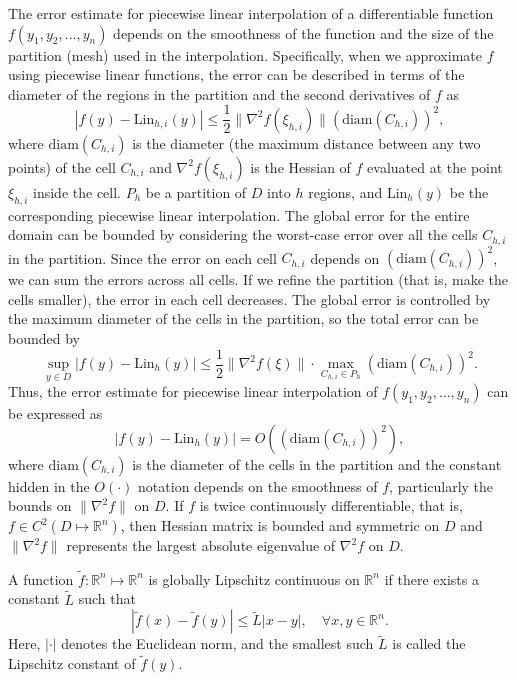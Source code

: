 \documentclass[preprint,12pt]{elsarticle}
\begin{document}
The error estimate for piecewise linear interpolation of a differentiable function \( f(y_1, y_2, \dots, y_n) \) depends on the smoothness of the function and the size of the partition (mesh) used in the interpolation. Specifically, when we approximate \( f \) using piecewise linear functions, the error can be described in terms of the diameter of the regions in the partition and the second derivatives of \( f \) \cite{burden2010numerical} as
\[
| f({y}) - \text{Lin}_{h,i}({y}) | \leq \frac{1}{2} \| \nabla^2 f(\xi_{h,i}) \| (\text{diam}(C_{h,i}))^2,
\]
where \( \text{diam}(C_{h,i}) \) is the diameter (the maximum distance between any two points) of the cell \( C_{h,i} \) and \( \nabla^2 f(\xi_{h,i}) \) is the Hessian of \( f \) evaluated at the point \( \xi_{h,i} \) inside the cell.
\( P_h \) be a partition of \( D \) into \( h \) regions, and \( \text{Lin}_{h}({y}) \) be the corresponding piecewise linear interpolation. The global error for the entire domain can be bounded by considering the worst-case error over all the cells \( C_{h,i} \) in the partition. Since the error on each cell \( C_{h,i} \) depends on \( (\text{diam}(C_{h,i}))^2 \), we can sum the errors across all cells. If we refine the partition (that is, make the cells smaller), the error in each cell decreases. The global error is controlled by the maximum diameter of the cells in the partition, so the total error can be bounded by
\[
\sup_{{y} \in D} | f({y}) - \text{Lin}_h({y}) |  \leq \frac{1}{2} \| \nabla^2 f(\xi) \| \cdot \max_{C_{h,i} \in P_h} \left( \text{diam}(C_{h,i}) \right)^2.
\]
Thus, the error estimate for piecewise linear interpolation of \( f(y_1, y_2, \dots, y_n) \) can be expressed as
\[
| f({y}) - \text{Lin}_h({y}) | = O\left((\text{diam}(C_{h,i}))^2\right),
\]
where \( \text{diam}(C_{h,i}) \) is the diameter of the cells in the partition and the constant hidden in the \( O(\cdot) \) notation depends on the smoothness of \( f \), particularly the bounds on \( \|\nabla^2 f\| \) on \( D \). If $f$ is twice continuously differentiable, that is, \( f \in C^2(D\mapsto\mathbb{R}^n) \), then Hessian matrix is bounded and symmetric on $D$  and \( \|\nabla^2 f\| \) represents the largest absolute eigenvalue of \( \nabla^2 f \) on \( D \).
\begin{defn}
A function \( \tilde f: \mathbb{R}^n \mapsto \mathbb{R}^n \) is globally Lipschitz continuous on \( \mathbb{R}^n \) if there exists a constant 
$\tilde{L}$ such that
\[
| \tilde f(x) - \tilde f(y) | \leq \tilde{L} | x - y |, \quad \forall x, y \in \mathbb{R}^n.
\]
Here, \( | \cdot | \) denotes the Euclidean norm, and the smallest such \(\tilde L \) is called the Lipschitz constant of \( \tilde f(y) \).
\end{defn}
\end{document}
